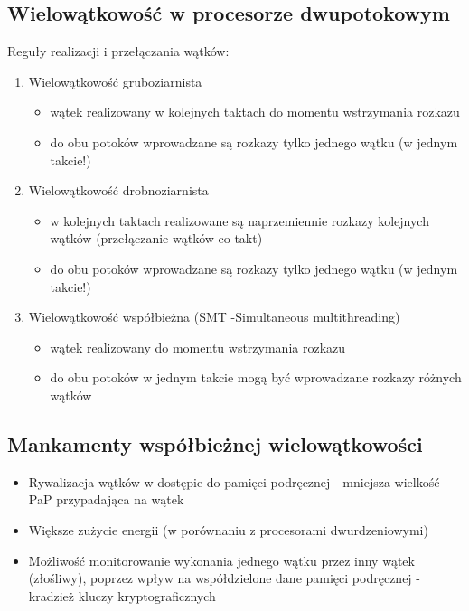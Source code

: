		\subsection*{Wielowątkowość w procesorze dwupotokowym}
		Reguły realizacji i przełączania wątków:
		\begin{enumerate}
			\item Wielowątkowość gruboziarnista
			\begin{itemize}
				\item wątek realizowany w kolejnych taktach do momentu wstrzymania rozkazu
				\item do obu potoków wprowadzane są rozkazy tylko jednego wątku (w jednym takcie!)
			\end{itemize}
			\item Wielowątkowość drobnoziarnista
			\begin{itemize}
				\item w kolejnych taktach realizowane są naprzemiennie rozkazy kolejnych wątków (przełączanie wątków co takt)
				\item do obu potoków wprowadzane są rozkazy tylko jednego wątku (w jednym takcie!)
			\end{itemize}
			\item Wielowątkowość współbieżna (SMT -Simultaneous multithreading)
			\begin{itemize}
				\item wątek realizowany do momentu wstrzymania rozkazu
				\item do obu potoków w jednym takcie mogą być wprowadzane rozkazy różnych wątków
			\end{itemize}
		\end{enumerate}
		\subsection*{Mankamenty współbieżnej wielowątkowości}
		\begin{itemize}
			\item Rywalizacja wątków w dostępie do pamięci podręcznej - mniejsza wielkość PaP przypadająca na wątek
			\item Większe zużycie energii (w porównaniu z procesorami dwurdzeniowymi)
			\item Możliwość monitorowanie wykonania jednego wątku przez inny wątek (złośliwy), poprzez wpływ na współdzielone dane pamięci podręcznej - kradzież kluczy kryptograficznych
		\end{itemize}
	
